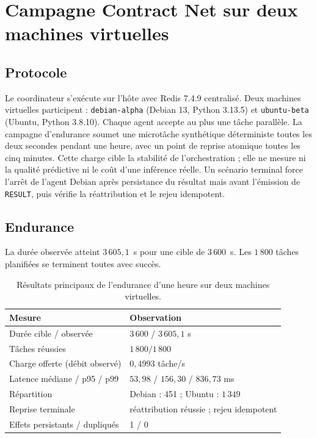 \section{Campagne Contract Net sur deux machines virtuelles}
\label{sec:cnp-multivm}

\subsection{Protocole}

Le coordinateur s’exécute sur l’hôte avec Redis 7.4.9 centralisé. Deux machines virtuelles participent : \texttt{debian-alpha} (Debian 13, Python 3.13.5) et \texttt{ubuntu-beta} (Ubuntu, Python 3.8.10). Chaque agent accepte au plus une tâche parallèle. La campagne d'endurance soumet une microtâche synthétique déterministe toutes les deux secondes pendant une heure, avec un point de reprise atomique toutes les cinq minutes. Cette charge cible la stabilité de l'orchestration ; elle ne mesure ni la qualité prédictive ni le coût d’une inférence réelle. Un scénario terminal force l’arrêt de l’agent Debian après persistance du résultat mais avant l’émission de \texttt{RESULT}, puis vérifie la réattribution et le rejeu idempotent.

\subsection{Endurance}

La durée observée atteint $3\,605{,}1$~s pour une cible de $3\,600$~s. Les $1\,800$ tâches planifiées se terminent toutes avec succès.

\begin{table}[H]
\centering
\caption{Résultats principaux de l'endurance d’une heure sur deux machines virtuelles.}
\label{tab:cnp-endurance}
\begin{tabularx}{0.92\textwidth}{p{} X}
\toprule
\textbf{Mesure} & \textbf{Observation} \\
\midrule
Durée cible / observée & $3\,600$ / $3\,605{,}1$ s \\
Tâches réussies & $1\,800/1\,800$ \\
Charge offerte (débit observé) & $0{,}4993$ tâche/s \\
Latence médiane / p95 / p99 & $53{,}98$ / $156{,}30$ / $836{,}73$ ms \\
Répartition & Debian : 451 ; Ubuntu : $1\,349$ \\
Reprise terminale & réattribution réussie ; rejeu idempotent \\
Effets persistants / dupliqués & 1 / 0 \\
\bottomrule
\end{tabularx}
\end{table}


